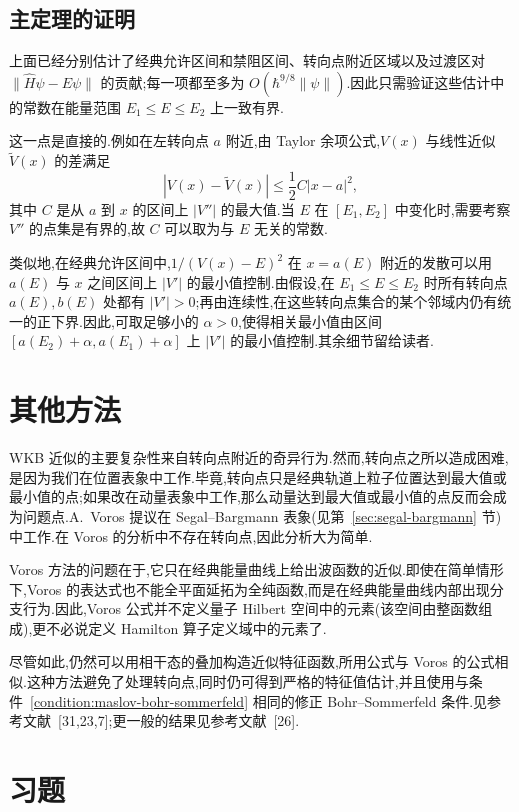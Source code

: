 \subsection{主定理的证明}
\label{subsec:wkb-main-theorem-proof}

上面已经分别估计了经典允许区间和禁阻区间、转向点附近区域以及过渡区对 $\|\widehat H\psi-E\psi\|$ 的贡献;每一项都至多为 $O(\hbar^{9/8}\|\psi\|)$.因此只需验证这些估计中的常数在能量范围 $E_1\leq E\leq E_2$ 上一致有界.

这一点是直接的.例如在左转向点 $a$ 附近,由 Taylor 余项公式,$V(x)$ 与线性近似 $\widetilde V(x)$ 的差满足
\[
|V(x)-\widetilde V(x)|\leq\frac12 C|x-a|^2,
\]
其中 $C$ 是从 $a$ 到 $x$ 的区间上 $|V''|$ 的最大值.当 $E$ 在 $[E_1,E_2]$ 中变化时,需要考察 $V''$ 的点集是有界的,故 $C$ 可以取为与 $E$ 无关的常数.

类似地,在经典允许区间中,$1/(V(x)-E)^2$ 在 $x=a(E)$ 附近的发散可以用 $a(E)$ 与 $x$ 之间区间上 $|V'|$ 的最小值控制.由假设,在 $E_1\leq E\leq E_2$ 时所有转向点 $a(E),b(E)$ 处都有 $|V'|>0$;再由连续性,在这些转向点集合的某个邻域内仍有统一的正下界.因此,可取足够小的 $\alpha>0$,使得相关最小值由区间 $[a(E_2)+\alpha,a(E_1)+\alpha]$ 上 $|V'|$ 的最小值控制.其余细节留给读者.

\section{其他方法}
\label{sec:wkb-other-approaches}

WKB 近似的主要复杂性来自转向点附近的奇异行为.然而,转向点之所以造成困难,是因为我们在位置表象中工作.毕竟,转向点只是经典轨道上粒子位置达到最大值或最小值的点;如果改在动量表象中工作,那么动量达到最大值或最小值的点反而会成为问题点.A.~Voros 提议在 Segal--Bargmann 表象(见第~\ref{sec:segal-bargmann} 节)中工作.在 Voros 的分析中不存在转向点,因此分析大为简单.

Voros 方法的问题在于,它只在经典能量曲线上给出波函数的近似.即使在简单情形下,Voros 的表达式也不能全平面延拓为全纯函数,而是在经典能量曲线内部出现分支行为.因此,Voros 公式并不定义量子 Hilbert 空间中的元素(该空间由整函数组成),更不必说定义 Hamilton 算子定义域中的元素了.

尽管如此,仍然可以用相干态的叠加构造近似特征函数,所用公式与 Voros 的公式相似.这种方法避免了处理转向点,同时仍可得到严格的特征值估计,并且使用与条件~\ref{condition:maslov-bohr-sommerfeld} 相同的修正 Bohr--Sommerfeld 条件.见参考文献~[31,23,7];更一般的结果见参考文献~[26].

\section{习题}
\label{sec:wkb-exercises}


